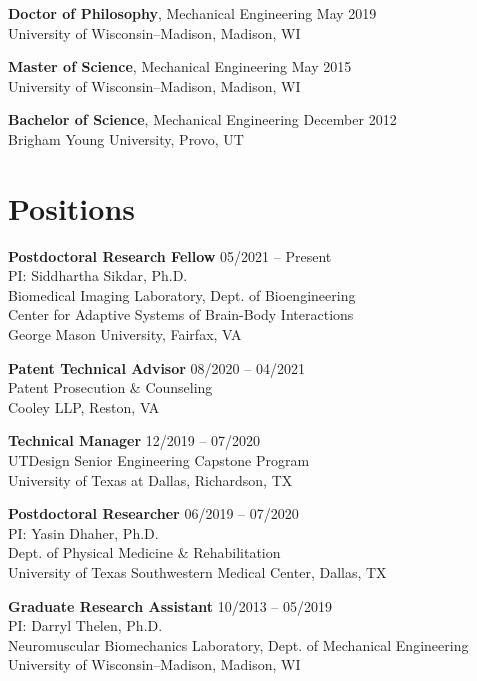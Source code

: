 \documentclass[letterpaper, 10pt]{article}
\begin{document}
\textbf{Doctor of Philosophy}, Mechanical Engineering 
\hfill May 2019\\ 
University of Wisconsin–Madison, Madison, WI

\medskip

\textbf{Master of Science}, Mechanical Engineering 
\hfill May 2015\\
University of Wisconsin–Madison, Madison, WI

\medskip

\textbf{Bachelor of Science}, Mechanical Engineering 
\hfill December 2012\\
Brigham Young University, Provo, UT

\section{Positions}

\textbf{Postdoctoral Research Fellow} 
\hfill 05/2021 -- Present
\\PI: Siddhartha Sikdar, Ph.D.
\\Biomedical Imaging Laboratory, Dept. of Bioengineering 
\\Center for Adaptive Systems of Brain-Body Interactions 
\\George Mason University, Fairfax, VA

\medskip

\textbf{Patent Technical Advisor}
\hfill 08/2020 -- 04/2021
\\Patent Prosecution \& Counseling 
\\Cooley LLP, Reston, VA

\medskip

\textbf{Technical Manager} \hfill 12/2019 -- 07/2020
\\UTDesign Senior Engineering Capstone Program 
\\University of Texas at Dallas, Richardson, TX

\medskip

\textbf{Postdoctoral Researcher} \hfill 06/2019 -- 07/2020
\\PI: Yasin Dhaher, Ph.D.
\\Dept. of Physical Medicine \& Rehabilitation 
\\University of Texas Southwestern Medical Center, Dallas, TX

\medskip

\textbf{Graduate Research Assistant} \hfill 10/2013 -- 05/2019
\\PI: Darryl Thelen, Ph.D.
\\Neuromuscular Biomechanics Laboratory, Dept. of Mechanical Engineering 
\\University of Wisconsin–Madison, Madison, WI
\end{document}
